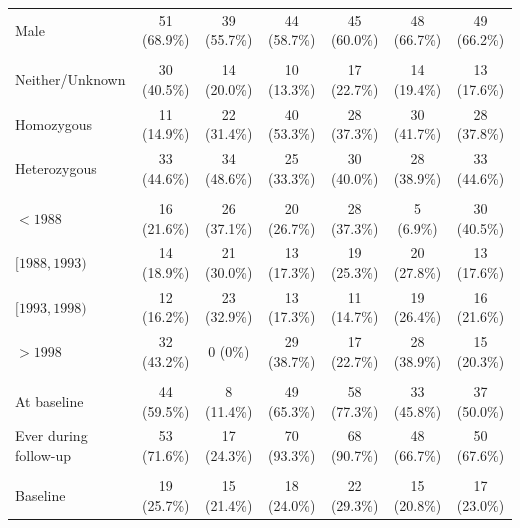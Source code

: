 \begin{table}[H]
\begin{threeparttable}
\begin{tabular}{lcccccc}
 \hspace{0.5cm} Male & 51 (68.9\%) & 39 (55.7\%) & 44 (58.7\%) & 45 (60.0\%) & 48 (66.7\%) & 49 (66.2\%)\\
 \rowcolor{Gainsboro!60}
 \multicolumn{7}{l}{\textbf{Genotype (F508del)}} \\[2pt]
 \hspace{0.5cm} Neither/Unknown & 30 (40.5\%) &	14 (20.0\%) & 10 (13.3\%) &	17 (22.7\%) & 14 (19.4\%) & 13 (17.6\%)\\
 \hspace{0.5cm} Homozygous & 11 (14.9\%) & 22 (31.4\%) & 40 (53.3\%) & 28 (37.3\%) & 30 (41.7\%) &	28 (37.8\%)\\
 \hspace{0.5cm} Heterozygous & 33 (44.6\%) & 34 (48.6\%) & 25 (33.3\%) & 30 (40.0\%) & 28 (38.9\%) & 33 (44.6\%)\\
 \rowcolor{Gainsboro!60}
  \multicolumn{7}{l}{ \textbf{Birth cohort}} \\[2pt]
 \hspace{0.5cm} $<1988$ & 16 (21.6\%) &	26 (37.1\%) & 20 (26.7\%) &	28 (37.3\%) & 5 (6.9\%) & 30 (40.5\%)\\
 \hspace{0.5cm} $[1988,1993)$ & 14 (18.9\%) & 21 (30.0\%) &	13 (17.3\%) &	19 (25.3\%) & 20 (27.8\%) & 13 (17.6\%)\\
 \hspace{0.5cm} $[1993,1998)$ & 12 (16.2\%) & 23 (32.9\%) &	13 (17.3\%) &	11 (14.7\%) & 19 (26.4\%) & 16 (21.6\%)\\
 \hspace{0.5cm} $>1998$ & 32 (43.2\%) &	0 (0\%)	& 29 (38.7\%) &	17 (22.7\%)&	28 (38.9\%) & 15 (20.3\%)\\
 \rowcolor{Gainsboro!60}
 \multicolumn{7}{l}{\textbf{Insurance use}} \\[2pt]
 \hspace{0.5cm} At baseline & 44 (59.5\%) & 8 (11.4\%) & 49 (65.3\%) &	58 (77.3\%) & 33 (45.8\%) & 37 (50.0\%)\\
 \hspace{0.5cm} Ever during follow-up & 53 (71.6\%) & 17 (24.3\%) & 70 (93.3\%) &	68 (90.7\%) & 48 (66.7\%) &	50 (67.6\%)\\
 \rowcolor{Gainsboro!60}
 \multicolumn{7}{l}{\textbf{Pseudomonas aeruginosa (pa)}} \\[2pt]
 \hspace{0.5cm} Baseline & 19 (25.7\%) & 15 (21.4\%) & 18 (24.0\%) & 22 (29.3\%) & 15 (20.8\%) & 17 (23.0\%)\\

\end{tabular}
\end{threeparttable}
\end{table}
